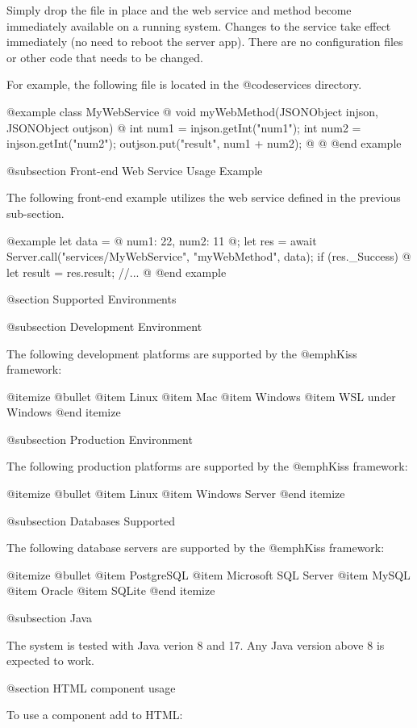 Simply drop the file in place and the web service and method become
immediately available on a running system.  Changes to the service
take effect immediately (no need to reboot the server app).  There are
no configuration files or other code that needs to be changed.

For example, the following file is located in the
@code{services} directory.

@example
class MyWebService @{
    void myWebMethod(JSONObject injson, JSONObject outjson) @{
        int num1 = injson.getInt("num1");
        int num2 = injson.getInt("num2");
        outjson.put("result", num1 + num2);
    @}
@}
@end example

@subsection Front-end Web Service Usage Example

The following front-end example utilizes the web service defined in the
previous sub-section.

@example
let data = @{
    num1:  22,
    num2:  11
@};
let res = await Server.call("services/MyWebService", "myWebMethod", data);
if (res._Success) @{
    let result = res.result;
    //...
@}
@end example
    

@section Supported Environments

@subsection Development Environment

The following development platforms are supported by the @emph{Kiss}
framework:

@itemize @bullet
@item
Linux
@item
Mac
@item
Windows
@item
WSL under Windows
@end itemize

@subsection Production Environment


The following production platforms are supported by the @emph{Kiss}
framework:

@itemize @bullet
@item
Linux
@item
Windows Server
@end itemize


@subsection Databases Supported


The following database servers are supported by the @emph{Kiss}
framework:

@itemize @bullet
@item
PostgreSQL
@item
Microsoft SQL Server
@item
MySQL
@item
Oracle
@item
SQLite
@end itemize


@subsection Java

The system is tested with Java verion 8 and 17.  Any Java version above 8
is expected to work.



@section HTML component usage
   
To use a component add to HTML:

